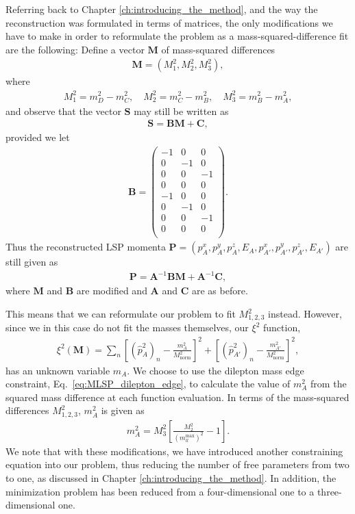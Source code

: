 \documentclass[twoside,english]{uiofysmaster}
\begin{document}
Referring back to Chapter \ref{ch:introducing_the_method}, and the way the reconstruction was formulated in terms of matrices, the only modifications we have to make in order to reformulate the problem as a mass-squared-difference fit are the following: Define a vector $\mathbf{M}$ of mass-squared differences
\begin{align}
	\mathbf{M} = (M^2_1, M^2_2, M^2_3),
\end{align}
where
\begin{align}
	M^2_1 = m_D^2 - m_C^2,\quad  M^2_2 = m_C^2 - m_B^2, \quad M^2_3 = m_B^2 - m_A^2,
\end{align}
and observe that the vector $\mathbf{S}$ may still be written as
\begin{align}
	\mathbf{S} = \mathbf{B}\mathbf{M} + \mathbf{C},
\end{align}
provided we let
\begin{align}
	\mathbf{B} = \begin{pmatrix}
					-1 & 0 & 0 \\
					0 & -1 & 0 \\
					0 & 0 & -1 \\
					0 & 0 & 0 \\
					-1 & 0 & 0  \\
					0 & -1 & 0  \\
					0 & 0 & -1  \\
					0 & 0 & 0 \\
	\end{pmatrix}.
\end{align}
Thus the reconstructed LSP momenta $\mathbf{P} = (p_A^x, p_A^y, p_A^z, E_A, p_{A'}^x, p_{A'}^y, p_{A'}^z, E_{A'})$ are still given as 
\begin{align}
	\mathbf{P} = \mathbf{A}^{-1}\mathbf{B}\mathbf{M} + \mathbf{A}^{-1}\mathbf{C},
\end{align}
where $\mathbf{M}$ and $\mathbf{B}$ are modified and $\mathbf{A}$ and $\mathbf{C}$ are as before.

This means that we can reformulate our problem to fit $M^2_{1,2,3}$ instead. However, since we in this case do not fit the masses themselves, our $\xi^2$ function,
\begin{align}
	\xi^2(\mathbf{M}) = \sum_n \left[(\hat p_{A}^2)_n - \frac{m_A^2}{M_\mathrm{norm}^2}\right]^2 + \left[(\hat p_{A'}^2)_n - \frac{m_{A'}^2}{M_\mathrm{norm}^2}\right]^2,\label{eq:xisquared_modified_repeat}
\end{align} 
has an unknown variable $m_A$. We choose to use the dilepton mass edge constraint, Eq.\ \eqref{eq:MLSP_dilepton_edge}, to calculate the value of $m_A^2$ from the squared mass difference at each function evaluation. In terms of the mass-squared differences $M^2_{1,2,3}$, $m_A^2$ is given as
\begin{align}
	m_A^2 = M^2_3\left[ \frac{M^2_2}{(m_{ll}^\mathrm{max})^ 2} - 1 \right].
\end{align}
We note that with these modifications, we have introduced another constraining equation into our problem, thus reducing the number of free parameters from two to one, as discussed in Chapter \ref{ch:introducing_the_method}. In addition, the minimization problem has been reduced from a four-dimensional one to a three-dimensional one. 
\end{document}
